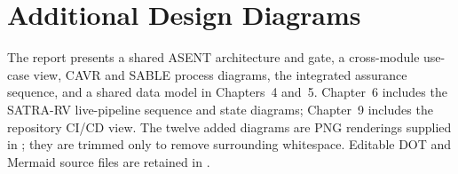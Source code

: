 \chapter{Additional Design Diagrams}
The report presents a shared ASENT architecture and gate, a cross-module use-case view, CAVR and SABLE process diagrams, the integrated assurance sequence, and a shared data model in Chapters~4 and~5. Chapter~6 includes the SATRA-RV live-pipeline sequence and state diagrams; Chapter~9 includes the repository CI/CD view. The twelve added diagrams are PNG renderings supplied in ; they are trimmed only to remove surrounding whitespace. Editable DOT and Mermaid source files are retained in .
